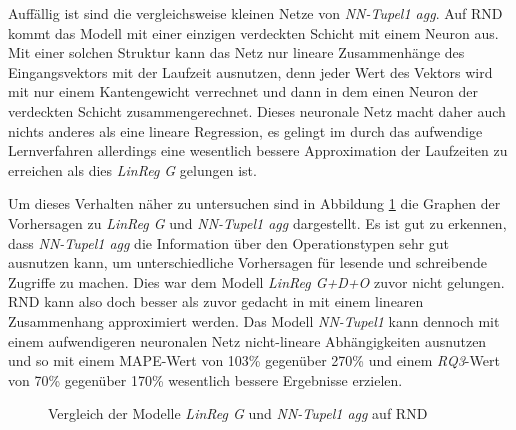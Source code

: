\documentclass[
	12pt,
	a4paper,
	BCOR10mm,
	DIV14,
	listof=totoc,
	bibliography=totoc,
	headsepline
]{scrreprt}
\begin{document}
Auffällig ist sind die vergleichsweise kleinen Netze von \textit{NN-Tupel1 agg}.
Auf RND kommt das Modell mit einer einzigen verdeckten Schicht mit einem Neuron aus.
Mit einer solchen Struktur kann das Netz nur lineare Zusammenhänge des Eingangsvektors mit der Laufzeit ausnutzen, denn jeder Wert des Vektors wird mit nur einem Kantengewicht verrechnet und dann in dem einen Neuron der verdeckten Schicht zusammengerechnet.
Dieses neuronale Netz macht daher auch nichts anderes als eine lineare Regression, es gelingt im durch das aufwendige Lernverfahren allerdings eine wesentlich bessere Approximation der Laufzeiten zu erreichen als dies \textit{LinReg G} gelungen ist.\medskip

Um dieses Verhalten näher zu untersuchen sind in Abbildung \ref{fig:lin_vergleich} die Graphen der Vorhersagen zu \textit{LinReg G} und \textit{NN-Tupel1 agg} dargestellt.
Es ist gut zu erkennen, dass \textit{NN-Tupel1 agg} die Information über den Operationstypen sehr gut ausnutzen kann, um unterschiedliche Vorhersagen für lesende und schreibende Zugriffe zu machen.
Dies war dem Modell \textit{LinReg G+D+O} zuvor nicht gelungen.
RND kann also doch besser als zuvor gedacht in mit einem linearen Zusammenhang approximiert werden.
Das Modell \textit{NN-Tupel1} kann dennoch mit einem aufwendigeren neuronalen Netz nicht-lineare Abhängigkeiten ausnutzen und so mit einem MAPE-Wert von 103\% gegenüber 270\% und einem \textit{RQ3}-Wert von 70\% gegenüber 170\% wesentlich bessere Ergebnisse erzielen.
\begin{figure}
	\centering
	\hfill
	\caption{Vergleich der Modelle \textit{LinReg G} und \textit{NN-Tupel1 agg} auf RND}
	\label{fig:lin_vergleich}
\end{figure} 
\clearpage
\end{document}
